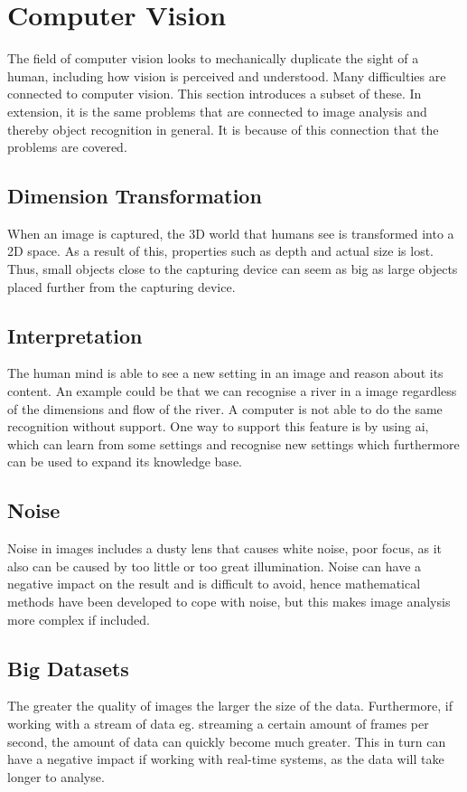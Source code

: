 \section{Computer Vision}\label{sc:com_vision}
The field of computer vision looks to mechanically duplicate the sight of a human, including how vision is perceived and understood.
Many difficulties are connected to computer vision. This section introduces a subset of these. In extension, it is the same problems that are connected to image analysis and thereby object recognition in general. It is because of this connection that the problems are covered.

\subsection{Dimension Transformation}
When an image is captured, the 3D world that humans see is transformed into a 2D space. As a result of this, properties such as depth and actual size is lost. Thus, small objects close to the capturing device can seem as big as large objects placed further from the capturing device.

\subsection{Interpretation}
The human mind is able to see a new setting in an image and reason about its content. An example could be that we can recognise a river in a image regardless of the dimensions and flow of the river. A computer is not able to do the same recognition without support. One way to support this feature is by using \gls{ai}, which can learn from some settings and recognise new settings which furthermore can be used to expand its knowledge base.

\subsection{Noise}
Noise in images includes a dusty lens that causes white noise, poor focus, as it also can be caused by too little or too great illumination. Noise can have a negative impact on the result and is difficult to avoid, hence mathematical methods have been developed to cope with noise, but this makes image analysis more complex if included.

\subsection{Big Datasets}
The greater the quality of images the larger the size of the data. Furthermore, if working with a stream of data eg. streaming a certain amount of frames per second, the amount of data can quickly become much greater. This in turn can have a negative impact if working with real-time systems, as the data will take longer to analyse. 

